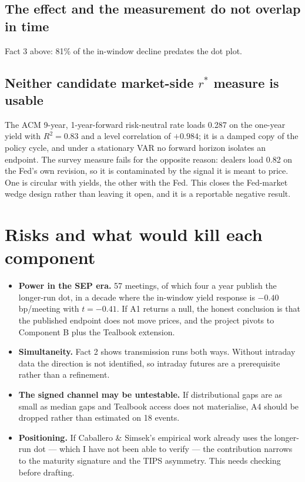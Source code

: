 \documentclass[11pt]{article}
\newcommand{\rs}{$r^{*}$}
\begin{document}
\subsection{The effect and the measurement do not overlap in time}

Fact 3 above: 81\% of the in-window decline predates the dot plot.

\subsection{Neither candidate market-side \rs{} measure is usable}

The ACM 9-year, 1-year-forward risk-neutral rate loads 0.287 on the one-year yield with
$R^2 = 0.83$ and a level correlation of $+0.984$; it is a damped copy of the policy cycle, and
under a stationary VAR no forward horizon isolates an endpoint. The survey measure fails for
the opposite reason: dealers load 0.82 on the Fed's own revision, so it is contaminated by the
signal it is meant to price. One is circular with yields, the other with the Fed. This closes
the Fed-market wedge design rather than leaving it open, and it is a reportable negative
result.

\section{Risks and what would kill each component}

\begin{itemize}\setlength\itemsep{0.15em}
\item \textbf{Power in the SEP era.} 57 meetings, of which four a year publish the longer-run
dot, in a decade where the in-window yield response is $-0.40$ bp/meeting with $t=-0.41$. If
A1 returns a null, the honest conclusion is that the published endpoint does not move prices,
and the project pivots to Component B plus the Tealbook extension.
\item \textbf{Simultaneity.} Fact 2 shows transmission runs both ways. Without intraday data
the direction is not identified, so intraday futures are a prerequisite rather than a
refinement.
\item \textbf{The signed channel may be untestable.} If distributional gaps are as small as
median gaps and Tealbook access does not materialise, A4 should be dropped rather than
estimated on 18 events.
\item \textbf{Positioning.} If Caballero \& Simsek's empirical work already uses the longer-run
dot --- which I have not been able to verify --- the contribution narrows to the maturity
signature and the TIPS asymmetry. This needs checking before drafting.
\end{itemize}
\end{document}
